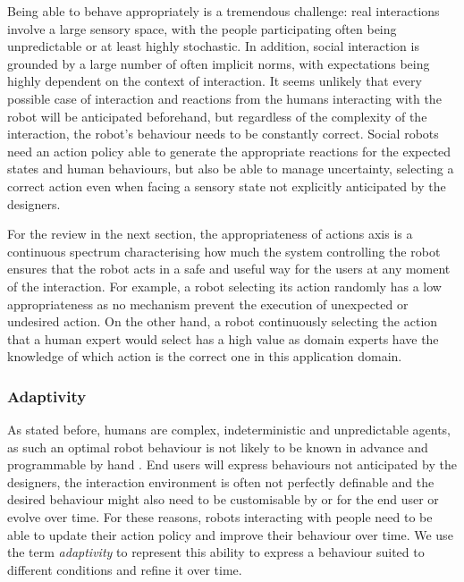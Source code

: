     Being able to behave appropriately is a tremendous challenge: real interactions involve a large sensory space, with the people participating often being unpredictable or at least highly stochastic. In addition, social interaction is grounded by a large number of often implicit norms, with expectations being highly dependent on the context of interaction. It seems unlikely that every possible case of interaction and reactions from the humans interacting with the robot will be anticipated beforehand, but regardless of the complexity of the interaction, the robot's behaviour needs to be constantly correct. Social robots need an action policy able to generate the appropriate reactions for the expected states and human behaviours, but also be able to manage uncertainty, selecting a correct action even when facing a sensory state not explicitly anticipated by the designers.
    
    For the review in the next section, the appropriateness of actions axis is a continuous spectrum characterising how much the system controlling the robot ensures that the robot acts in a safe and useful way for the users at any moment of the interaction. For example, a robot selecting its action randomly has a low appropriateness as no mechanism prevent the execution of unexpected or undesired action. On the other hand, a robot continuously selecting the action that a human expert would select has a high value as domain experts have the knowledge of which action is the correct one in this application domain.


\subsubsection{Adaptivity}	\label{ssec:adap}
    As stated before, humans are complex, indeterministic and unpredictable agents, as such an optimal robot behaviour is not likely to be known in advance and programmable by hand \citep{dautenhahn2004robots,argall2009survey}. End users will express behaviours not anticipated by the designers, the interaction environment is often not perfectly definable and the desired behaviour might also need to be customisable by or for the end user or evolve over time. For these reasons, robots interacting with people need to be able to update their action policy and improve their behaviour over time. We use the term \emph{adaptivity} to represent this ability to express a behaviour suited to different conditions and refine it over time. 
    
